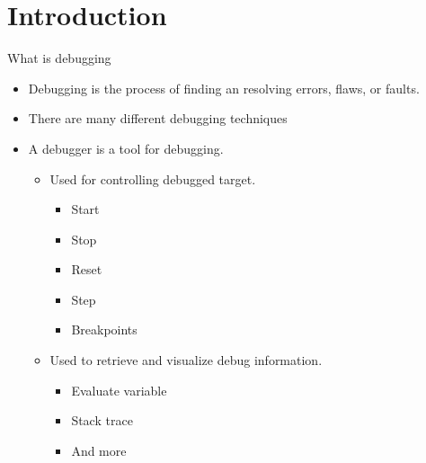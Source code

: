 \section{Introduction}

\begin{frame}{What is debugging}
	\begin{itemize}
		\item Debugging is the process of finding an resolving errors, flaws, or faults.
		\item There are many different debugging techniques
		\item A debugger is a tool for debugging.
			\begin{itemize}
				\item Used for controlling debugged target.
			    \begin{itemize}
            \item Start
            \item Stop
            \item Reset
            \item Step
            \item Breakpoints
          \end{itemize}
				\item Used to retrieve and visualize debug information.
			    \begin{itemize}
            \item Evaluate variable
            \item Stack trace
            \item And more
          \end{itemize}
      \end{itemize}
	\end{itemize}
\end{frame}


